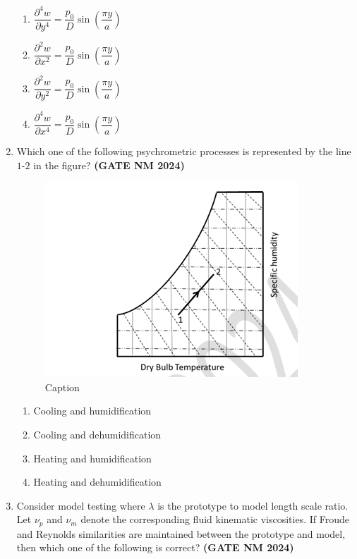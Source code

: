 \documentclass[journal,15pt,onecolumn]{IEEEtran}
\theoremstyle{remark}
\begin{document}
\begin{enumerate}
\begin{enumerate}
    \item $\dfrac{\partial^4 w}{\partial y^4} = \dfrac{p_0}{D} \sin \left(\dfrac{\pi y}{a}\right)$
    \item $\dfrac{\partial^2 w}{\partial x^2} = \dfrac{p_0}{D} \sin \left(\dfrac{\pi y}{a}\right)$
    \item $\dfrac{\partial^2 w}{\partial y^2} = \dfrac{p_0}{D} \sin \left(\dfrac{\pi y}{a}\right)$
    \item $\dfrac{\partial^4 w}{\partial x^4} = \dfrac{p_0}{D} \sin \left(\dfrac{\pi y}{a}\right)$
\end{enumerate}

\item Which one of the following psychrometric processes is represented by the line $1$-$2$ in the figure?\hfill \textbf{ (GATE NM 2024)}


\begin{figure}
    \centering
    \includegraphics[width=0.5\linewidth]{figures.tex/Screenshot 2025-08-22 145453.png}
    \caption{Caption}
    \label{fig:placeholder}
\end{figure}


\begin{enumerate}
    \item Cooling and humidification
    \item Cooling and dehumidification
    \item Heating and humidification
    \item Heating and dehumidification
\end{enumerate}

\item
Consider model testing where $\lambda$ is the prototype to model length scale ratio. 
    Let $\nu_p$ and $\nu_m$ denote the corresponding fluid kinematic viscosities. 
    If Froude and Reynolds similarities are maintained between the prototype and model, 
    then which one of the following is correct?\hfill \textbf{ (GATE NM 2024)}
    

\end{enumerate}
\end{document}
